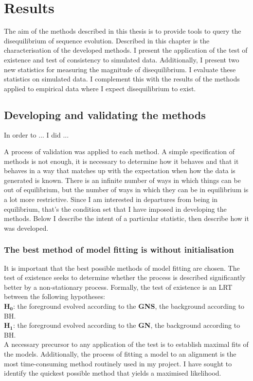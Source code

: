\chapter{Results}

The aim of the methods described in this thesis is to provide tools to query the disequilibrium of sequence evolution. Described in this chapter is the characterisation of the developed methods. I present the application of the test of existence and test of consistency to simulated data. Additionally, I present two new statistics for measuring the magnitude of disequilibrium. I evaluate these statistics on simulated data. I complement this with the results of the methods applied to empirical data where I expect disequilibrium to exist.

\section*{Developing and validating the methods}

In order to ... I did ...

A process of validation was applied to each method. A simple specification of methods is not enough, it is necessary to determine how it behaves and that it behaves in a way that matches up with the expectation when how the data is generated is known. There is an infinite number of ways in which things can be out of equilibrium, but the number of ways in which they can be in equilibrium is a lot more restrictive. Since I am interested in departures from being in equilibrium, that’s the condition set that I have imposed in developing the methods. Below I describe the intent of a particular statistic, then describe how it was developed.

\subsection*{The best method of model fitting is without initialisation}

It is important that the best possible methods of model fitting are chosen. The test of existence seeks to determine whether the process is described significantly better by a non-stationary process. Formally, the test of existence is an LRT between the following hypotheses:\\ $\mathbf{H_0}$: the foreground evolved according to the \textbf{GNS}, the background according to BH. \\ $\mathbf{H_1}$: the foreground evolved according to the \textbf{GN}, the background according to BH.\\
A necessary precursor to any application of the test is to establish maximal fits of the models. Additionally, the process of fitting a model to an alignment is the most time-consuming method routinely used in my project. I have sought to identify the quickest possible method that yields a maximised likelihood. 

